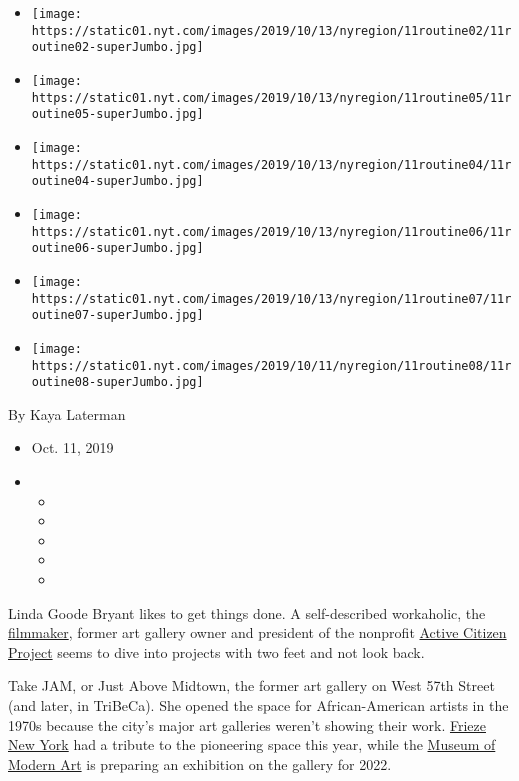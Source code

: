\begin{itemize}
\item
  \texttt{[image: https://static01.nyt.com/images/2019/10/13/nyregion/11routine02/11routine02-superJumbo.jpg]}
\item
  \texttt{[image: https://static01.nyt.com/images/2019/10/13/nyregion/11routine05/11routine05-superJumbo.jpg]}
\item
  \texttt{[image: https://static01.nyt.com/images/2019/10/13/nyregion/11routine04/11routine04-superJumbo.jpg]}
\item
  \texttt{[image: https://static01.nyt.com/images/2019/10/13/nyregion/11routine06/11routine06-superJumbo.jpg]}
\item
  \texttt{[image: https://static01.nyt.com/images/2019/10/13/nyregion/11routine07/11routine07-superJumbo.jpg]}
\item
  \texttt{[image: https://static01.nyt.com/images/2019/10/11/nyregion/11routine08/11routine08-superJumbo.jpg]}
\end{itemize}

By Kaya Laterman

\begin{itemize}
\item
  Oct. 11, 2019
\item
  \begin{itemize}
  \item
  \item
  \item
  \item
  \item
  \end{itemize}
\end{itemize}

Linda Goode Bryant likes to get things done. A self-described
workaholic, the \href{https://www.imdb.com/name/nm1326497/}{filmmaker},
former art gallery owner and president of the nonprofit
\href{https://nyshealthfoundation.org/grantee/active-citizen-project-inc/}{Active
Citizen Project} seems to dive into projects with two feet and not look
back.

Take JAM, or Just Above Midtown, the former art gallery on West 57th
Street (and later, in TriBeCa). She opened the space for
African-American artists in the 1970s because the city's major art
galleries weren't showing their work.
\href{https://frieze.com/fairs/frieze-new-york}{Frieze New York} had a
tribute to the pioneering space this year, while the
\href{https://www.moma.org/calendar/exhibitions/5078}{Museum of Modern
Art} is preparing an exhibition on the gallery for 2022.

